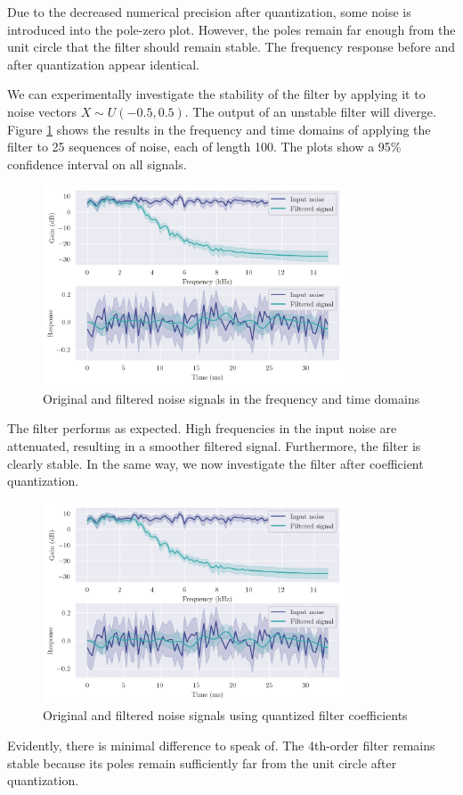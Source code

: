 Due to the decreased numerical precision after quantization, some noise is introduced into the pole-zero plot. However, the poles remain far enough from the unit circle that the filter should remain stable. The frequency response before and after quantization appear identical.

\newpage

We can experimentally investigate the stability of the filter by applying it to noise vectors $X\sim U(-0.5, 0.5)$. The output of an unstable filter will diverge. Figure \ref{fig:q7_4th_stability} shows the results in the frequency and time domains of applying the filter to 25 sequences of noise, each of length 100. The plots show a 95\% confidence interval on all signals.

\begin{figure}[ht]
    \centering
    \includegraphics[width=0.8\textwidth]{images/q7_4th_stability.png}
    \caption{Original and filtered noise signals in the frequency and time domains}
    \label{fig:q7_4th_stability}
\end{figure}

The filter performs as expected. High frequencies in the input noise are attenuated, resulting in a smoother filtered signal. Furthermore, the filter is clearly stable. In the same way, we now investigate the filter after coefficient quantization.

\begin{figure}[!ht]
    \centering
    \includegraphics[width=0.8\textwidth]{images/q7_q4th_stability.png}
    \caption{Original and filtered noise signals using quantized filter coefficients}
    \label{fig:q7_q4th_stability}
\end{figure}

Evidently, there is minimal difference to speak of. The 4th-order filter remains stable because its poles remain sufficiently far from the unit circle after quantization.
